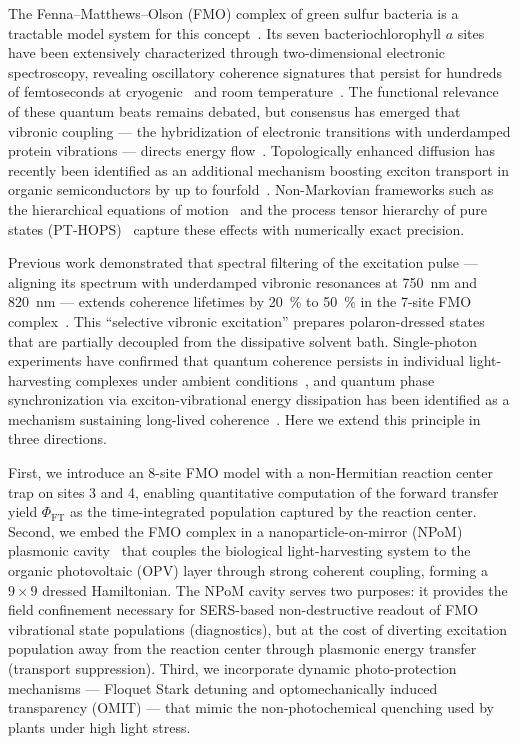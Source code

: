 \documentclass[12pt]{article}
\begin{document}
The Fenna--Matthews--Olson (FMO) complex of green sulfur bacteria is a tractable model system for this concept~\cite{Fenna1974}.
Its seven bacteriochlorophyll $a$ sites have been extensively characterized through two-dimensional electronic spectroscopy, revealing oscillatory coherence signatures that persist for hundreds of femtoseconds at cryogenic~\cite{Engel2007} and room temperature~\cite{Panitchayangkoon2010}.
The functional relevance of these quantum beats remains debated, but consensus has emerged that vibronic coupling --- the hybridization of electronic transitions with underdamped protein vibrations --- directs energy flow~\cite{Chin2013,Christensson2012}.
Topologically enhanced diffusion has recently been identified as an additional mechanism boosting exciton transport in organic semiconductors by up to fourfold~\cite{Thompson2025}.
Non-Markovian frameworks such as the hierarchical equations of motion~\cite{Tanimura1989} and the process tensor hierarchy of pure states (PT-HOPS)~\cite{Varvelo2021,Citty2024} capture these effects with numerically exact precision.

Previous work demonstrated that spectral filtering of the excitation pulse --- aligning its spectrum with underdamped vibronic resonances at \SI{750}{\nm} and \SI{820}{\nm} --- extends coherence lifetimes by \SI{20}{\percent} to \SI{50}{\percent} in the 7-site FMO complex~\cite{Kouam2026}.
This ``selective vibronic excitation'' prepares polaron-dressed states that are partially decoupled from the dissipative solvent bath.
Single-photon experiments have confirmed that quantum coherence persists in individual light-harvesting complexes under ambient conditions~\cite{Li2023}, and quantum phase synchronization via exciton-vibrational energy dissipation has been identified as a mechanism sustaining long-lived coherence~\cite{Zhu2024}.
Here we extend this principle in three directions.

First, we introduce an 8-site FMO model with a non-Hermitian reaction center trap on sites 3 and 4, enabling quantitative computation of the forward transfer yield $\Phi_{\mathrm{FT}}$ as the time-integrated population captured by the reaction center.
Second, we embed the FMO complex in a nanoparticle-on-mirror (NPoM) plasmonic cavity~\cite{Chikkaraddy2016} that couples the biological light-harvesting system to the organic photovoltaic (OPV) layer through strong coherent coupling, forming a $9 \times 9$ dressed Hamiltonian.
The NPoM cavity serves two purposes: it provides the field confinement necessary for SERS-based non-destructive readout of FMO vibrational state populations (diagnostics), but at the cost of diverting excitation population away from the reaction center through plasmonic energy transfer (transport suppression).
Third, we incorporate dynamic photo-protection mechanisms --- Floquet Stark detuning and optomechanically induced transparency (OMIT) --- that mimic the non-photochemical quenching used by plants under high light stress.
\end{document}
